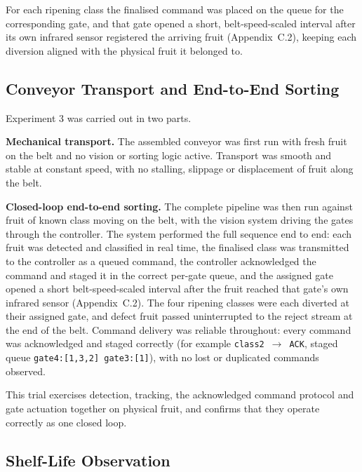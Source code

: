 For each ripening class the finalised command was placed on the queue for the corresponding gate, and that gate opened a short, belt-speed-scaled interval after its own infrared sensor registered the arriving fruit (Appendix~C.2), keeping each diversion aligned with the physical fruit it belonged to.

\subsection{Conveyor Transport and End-to-End Sorting}
\label{sec:r_sorting}

Experiment 3 was carried out in two parts.

\textbf{Mechanical transport.} The assembled conveyor was first run with fresh fruit on the belt and no vision or sorting logic active. Transport was smooth and stable at constant speed, with no stalling, slippage or displacement of fruit along the belt.

\textbf{Closed-loop end-to-end sorting.} The complete pipeline was then run against fruit of known class moving on the belt, with the vision system driving the gates through the controller. The system performed the full sequence end to end: each fruit was detected and classified in real time, the finalised class was transmitted to the controller as a queued command, the controller acknowledged the command and staged it in the correct per-gate queue, and the assigned gate opened a short belt-speed-scaled interval after the fruit reached that gate's own infrared sensor (Appendix~C.2). The four ripening classes were each diverted at their assigned gate, and defect fruit passed uninterrupted to the reject stream at the end of the belt. Command delivery was reliable throughout: every command was acknowledged and staged correctly (for example \texttt{class2}~$\rightarrow$~\texttt{ACK}, staged queue \texttt{gate4:[1,3,2] gate3:[1]}), with no lost or duplicated commands observed.


This trial exercises detection, tracking, the acknowledged command protocol and gate actuation together on physical fruit, and confirms that they operate correctly as one closed loop.

\subsection{Shelf-Life Observation}
\label{sec:r_shelflife}


